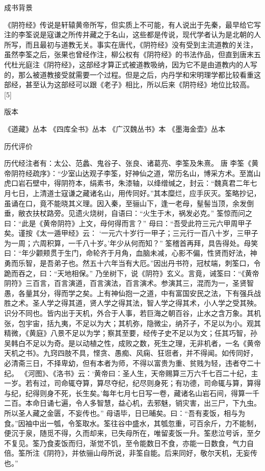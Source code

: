 \documentclass[12pt,UTF8]{ctexbook}
\begin{document}
成书背景

《阴符经》传说是轩辕黄帝所写，但实质上不可能，有人说出于先秦，最早给它写注的李筌说是寇谦之所传并藏之于名山，这些都是传说，现代学者认为是北朝的人所写，而且最初与道教无关。事实在唐代，《阴符经》没有受到主流道教的关注，虽然李筌之后，张果也曾经作注，柳公权有《阴符经》的书法作品，但直到唐末五代杜光庭注《阴符经》，这部经才算正式被道教吸纳，因为它不是由道教内的人写的，那么被道教接受就需要一个过程。但是之后，内丹学和宋明理学都比较看重这部经，甚至认为这部经可以跟《老子》相比，所以后来《阴符经》地位比较高。 [5]

版本

《道藏》丛本
《四库全书》丛本
《广汉魏丛书》本
《墨海金壶》丛本


历代评价

历代经注者有：太公、范蠡、鬼谷子、张良、诸葛亮、李筌及朱熹。
唐 李筌《黄帝阴符经疏序》：“少室山达观子李筌，好神仙之道，常历名山，博采方术。至嵩山虎口岩石壁中，得阴符本，绢素书，朱漆轴，以绛缯缄之，封云：“魏真君二年七月七日，上清道士寇谦之藏诸名山，用传同好。”其本糜烂，应手灰灭。筌略抄记，虽诵在口，竟不能晓其义理。因入秦，至骊山下，逢一老母，髽髻当顶，余发倒垂，敝衣扶杖路旁。见遗火烧树，自语曰：“火生于木，祸发必克。” 筌惊而问之曰：“此是《黄帝阴符》上文，母何得而言？” 母曰：“吾受此符三元六甲周甲子矣。谨按《太一遁甲经》云： ‘一元六十岁行一甲子；三元行一百八十岁，三甲子为一周；六周积算，一千八十岁。’年少从何而知？” 筌稽首再拜，具告得处。母笑曰：“年少颧颊贯于生门，命轮齐于月角，血脑未减，心影不偏，性贤而好法，神勇而乐智，是吾弟子也。然五十六年当有大厄。”因出丹书符，冠杖端，刺筌口，令跪而吞之，曰：“天地相保。” 乃坐树下，说《阴符》玄义。言竟，诫筌曰：“《黄帝阴符》三百言，百言演道，百言演法，百言演术。参演其三，混而为一，圣贤智愚，各量其分，得而学之矣。上有神仙抱一之道，中有富国安民之法，下有强兵战胜之术。圣人学之得其道，贤人学之得其法，智人学之得其术，小人学之受其殃。识分不同也。皆内出于天机，外合于人事，若巨海之朝百谷，止水之含万象。其机张，包宇宙，括九夷，不足以为大；其机弥，隐微尘，纳芥子，不足以为小。观其精微，《黄庭》八景不足以为学；察其至要，经传子史不足以为文；任其巧智，孙吴韩白不足以为奇。是以动植之性，成败之数，死生之理，无非机者，一名《黄帝天机之书》。九窍四肢不具，悭贪、愚痴、风痫、狂诳者，并不得闻。如传同好，必清斋三日，不择卑幼，但有本者为师，不得以富贵为重、贫贱为轻，违者夺二十纪。
《河图》、《洛书》云：‘黄帝曰：圣人生，天帝赐算三万六千七百二十纪，主一岁。若有过，司命辄夺算，算尽夺纪，纪尽则身死；有功德，司命辄与算，算得与纪，纪得则身不死，长生矣。’每年七月七日写一卷，藏诸名山岩石间，得算一千二百。本命日诵七遍，令人多智慧，益心机，去邪魅，销灾害，出三尸，下九虫。所以圣人藏之金匮，不妄传也。” 母语毕，日已晡矣。曰：“吾有麦饭，相与为食。”因袖中出一瓠，令筌取水。筌往谷中盛水，其瓠忽重，可百余斤，力不能制，便沉于泉，随觅不得，久而却来，已失母所在，唯留麦饭一升。筌悲泣号诉，至夕不复见。筌乃食麦饭而归，渐觉不饥，至令能数日不食，亦能一日数食，气力自倍。筌所注《阴符》，并依骊山母所说，非筌自能。后来同好，敬尔天机，无妄传也。”
\end{document}
